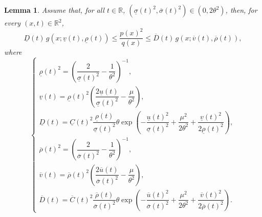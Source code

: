\documentclass[10pt,a4paper]{amsart}
\newtheorem{lemma}{Lemma}
\begin{document}
\begin{lemma}
\label{lem:bounds_p2_over_q}
Assume that, for all $t \in \mathbb{R}$, $(\underline{\sigma}(t)^2,\overline{\sigma}(t)^2)\in (0,2\theta^2)$, then, for every $(x,t) \in \mathbb{R}^2$,
\begin{equation}
\underline{D}(t)\, g(x;\underline{v}(t),\underline{\rho}(t)) \leq
\frac{p(x)^2}{q(x)}\leq \overline{D}(t)\, g(x;\overline{v}(t),\overline{\rho}(t)),
\label{eq:boundp2q}
\end{equation}
where
\begin{equation}
\begin{cases}
\underline{\rho}(t)^2
=
\left(\dfrac{2}{\underline{\sigma}(t)^2}-\dfrac{1}{\theta^2}\right)^{-1},\\[2ex]
\underline{v}(t)
=
\underline{\rho}(t)^2
\left(
\dfrac{2\underline{u}(t)}{\underline{\sigma}(t)^2}
-\dfrac{\mu}{\theta^2}
\right),\\[2ex]
\underline{D}(t)
=
\underline{C}(t)^2
\dfrac{\underline{\rho}(t)}{\underline{\sigma}(t)^2}\theta
\exp\left(
-\dfrac{\underline{u}(t)^2}{\underline{\sigma}(t)^2}
+\dfrac{\mu^2}{2\theta^2}
+\dfrac{\underline{v}(t)^2}{2\underline{\rho}(t)^2}
\right),\\
\overline{\rho}(t)^2
=
\left(\dfrac{2}{\overline{\sigma}(t)^2}-\dfrac{1}{\theta^2}\right)^{-1},\\[2ex]
\overline{v}(t)
=
\overline{\rho}(t)^2
\left(
\dfrac{2\overline{u}(t)}{\overline{\sigma}(t)^2}
-\dfrac{\mu}{\theta^2}
\right),\\[2ex]
\overline{D}(t)
=
\overline{C}(t)^2
\dfrac{\overline{\rho}(t)}{\overline{\sigma}(t)^2}\theta
\exp\left(
-\dfrac{\overline{u}(t)^2}{\overline{\sigma}(t)^2}
+\dfrac{\mu^2}{2\theta^2}
+\dfrac{\overline{v}(t)^2}{2\overline{\rho}(t)^2}
\right).
\end{cases}
\end{equation}
\end{lemma}
\end{document}
